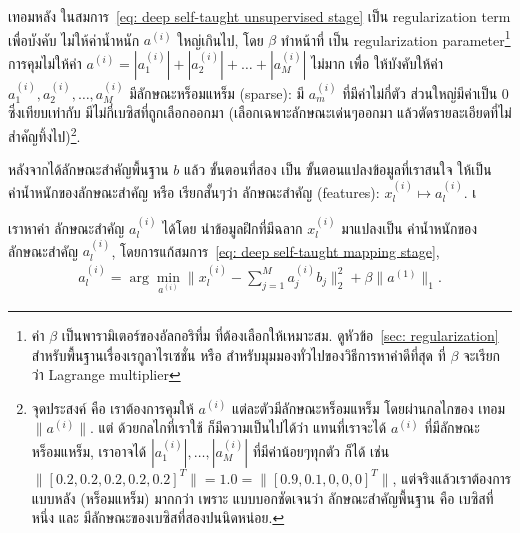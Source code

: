 เทอมหลัง ในสมการ~\ref{eq: deep self-taught unsupervised stage} เป็น  regularization term  เพื่อบังคับ ไม่ให้ค่าน้ำหนัก $a^{(i)}$ ใหญ่เกินไป,
โดย $\beta$ ทำหน้าที่ เป็น regularization parameter\footnote{
ค่า $\beta$ เป็นพารามิเตอร์ของอัลกอริทึ่ม ที่ต้องเลือกให้เหมาะสม.
ดูหัวข้อ~\ref{sec: regularization} สำหรับพื้นฐานเรื่องเรกูลาไรเซชั่น หรือ \cite{ChongZak2ndEd} สำหรับมุมมองทั่วไปของวิธีการหาค่าดีที่สุด ที่ $\beta$ จะเรียกว่า Lagrange multiplier}
การคุมไม่ให้ค่า $a^{(i)} = |a^{(i)}_1| + |a^{(i)}_2| + \ldots + |a^{(i)}_M|$ ไม่มาก เพื่อ ให้บังคับให้ค่า $a^{(i)}_1, a^{(i)}_2, \ldots, a^{(i)}_M$ มีลักษณะหร็อมแหร็ม (sparse): มี $a^{(i)}_m$ ที่มีค่าไม่กี่ตัว ส่วนใหญ่มีค่าเป็น $0$ ซึ่งเทียบเท่ากับ มีไม่กี่เบซิสที่ถูกเลือกออกมา (เลือกเฉพาะลักษณะเด่นๆออกมา แล้วตัดรายละเอียดที่ไม่สำคัญทิ้งไป)\footnote{
จุดประสงค์ คือ เราต้องการคุมให้ $a^{(i)}$ แต่ละตัวมีลักษณะหร็อมแหร็ม โดยผ่านกลไกของ เทอม $\|a^{(i)}\|$.
แต่ ด้วยกลไกที่เราใช้ ก็มีความเป็นไปได้ว่า แทนที่เราจะได้ $a^{(i)}$ ที่มีลักษณะหร็อมแหร็ม,
เราอาจได้ $|a^{(i)}_1|, \ldots, |a^{(i)}_M|$ ที่มีค่าน้อยๆทุกตัว ก็ได้ เช่น
$\| [0.2, 0.2, 0.2, 0.2, 0.2]^T \| = 1.0 = \| [0.9, 0.1, 0, 0, 0]^T \|$, แต่จริงแล้วเราต้องการแบบหลัง (หร็อมแหร็ม) มากกว่า เพราะ แบบบอกชัดเจนว่า ลักษณะสำคัญพื้นฐาน คือ เบซิสที่หนึ่ง และ มีลักษณะของเบซิสที่สองปนนิดหน่อย.
}.


หลังจากได้ลักษณะสำคัญพื้นฐาน $b$ แล้ว 
%
ขั้นตอนที่สอง เป็น ขั้นตอนแปลงข้อมูลที่เราสนใจ ให้เป็น ค่าน้ำหนักของลักษณะสำคัญ หรือ เรียกสั้นๆว่า ลักษณะสำคัญ (features): $x_l^{(i)} \mapsto a_l^{(i)}$.
เ%

เราหาค่า ลักษณะสำคัญ $a_l^{(i)}$ ได้โดย นำข้อมูลฝึกที่มีฉลาก $x_l^{(i)}$ มาแปลงเป็น ค่าน้ำหนักของลักษณะสำคัญ $a_l^{(i)}$, โดยการแก้สมการ~\ref{eq: deep self-taught mapping stage},
\begin{eqnarray}
  a_l^{(i)} = \arg \min_{a^{(i)}} \| x_l^{(i)} - \sum_{j=1}^M a_j^{(i)} b_j \|_2^2 + \beta \| a^{(1)} \|_1.
\label{eq: deep self-taught mapping stage}  
\end{eqnarray}

